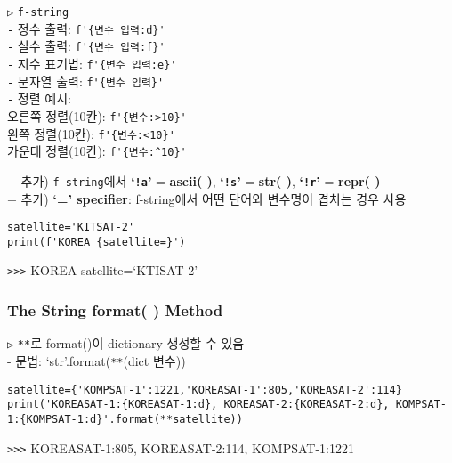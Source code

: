 \documentclass[11pt,a4paper]{article}
\begin{document}
\begin{spacing}{1.5}
\texttt{▷} \verb|f-string|\\
\hspace*{1em}\texttt{-} 정수 출력: \verb|f'{변수 입력:d}'|\\
\hspace*{1em}\texttt{-} 실수 출력: \verb|f'{변수 입력:f}'|\\
\hspace*{1em}\texttt{-} 지수 표기법: \verb|f'{변수 입력:e}'|\\
\hspace*{1em}\texttt{-} 문자열 출력: \verb|f'{변수 입력}'|\\
\hspace*{1em}\texttt{-} 정렬 예시:\\
\hspace*{4em}오른쪽 정렬(10칸): \verb|f'{변수:>10}'|\\
\hspace*{4em}왼쪽 정렬(10칸): \verb|f'{변수:<10}'|\\
\hspace*{4em}가운데 정렬(10칸): \verb|f'{변수:^10}'|\\
\end{spacing}

\begin{spacing}{1.5}
+ 추가) \verb|f-string|에서 \textbf{`\texttt{!a}'} = \textbf{ascii( )}, \textbf{`\texttt{!s}'} = \textbf{str( )}, \textbf{`\texttt{!r}'} = \textbf{repr( )}\\

+ 추가) \textbf{`=' specifier}: f-string에서 어떤 단어와 변수명이 겹치는 경우 사용
\begin{lstlisting}[label={list:first}]
satellite='KITSAT-2'
print(f'KOREA {satellite=}')
\end{lstlisting}
\end{spacing}
\verb|>>>| KOREA satellite=`KTISAT-2'

\subsubsection{\Large\textbf{The String format( ) Method}}
\begin{spacing}{1.5}
\texttt{▷} \verb|**|로 format()이 dictionary 생성할 수 있음\\
\hspace*{2em}- 문법: `str'.format(\verb|**|(dict 변수))
\begin{lstlisting}[label={list:first}]
satellite={'KOMPSAT-1':1221,'KOREASAT-1':805,'KOREASAT-2':114}
print('KOREASAT-1:{KOREASAT-1:d}, KOREASAT-2:{KOREASAT-2:d}, KOMPSAT-1:{KOMPSAT-1:d}'.format(**satellite))
\end{lstlisting}
\end{spacing}
\verb|>>>| KOREASAT-1:805, KOREASAT-2:114, KOMPSAT-1:1221\\
\end{document}
